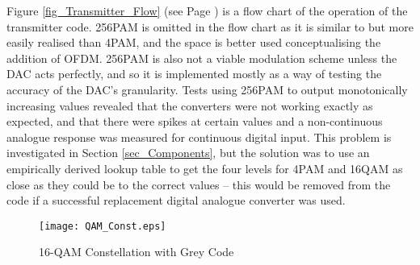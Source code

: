 \documentclass[../main.tex]{subfiles}
\begin{document}
Figure \ref{fig_Transmitter_Flow} (see Page \pageref{fig_Transmitter_Flow}) is a flow chart of the operation of the transmitter code.
256PAM is omitted in the flow chart as it is similar to but more easily realised than 4PAM, and the space is better used conceptualising the addition of OFDM.
256PAM is also not a viable modulation scheme unless the DAC acts perfectly, and so it is implemented mostly as a way of testing the accuracy of the DAC's granularity.
Tests using 256PAM to output monotonically increasing values revealed that the converters were not working exactly as expected, and that there were spikes at certain values and a non-continuous analogue response was measured for continuous digital input.
This problem is investigated in Section \ref{sec_Components}, but the solution was to use an empirically derived lookup table to get the four levels for 4PAM and 16QAM as close as they could be to the correct values -- this would be removed from the code if a successful replacement digital analogue converter was used.\\

\begin{figure}[ht]
	\centering
	\texttt{[image: QAM\_Const.eps]}
	\caption{16-QAM Constellation with Grey Code}
	\label{fig_QAM Constellation}
\end{figure}
\end{document}
